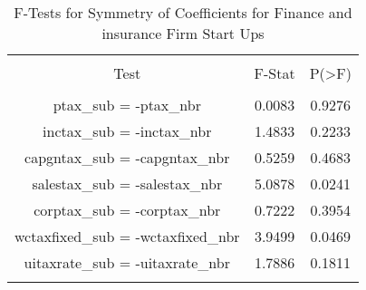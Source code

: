 
\begin{table}[!htbp] \centering 
  \caption{F-Tests for Symmetry of Coefficients for Finance and insurance Firm Start Ups} 
  \label{52Ftests} 
\begin{tabular}{@{\extracolsep{5pt}} ccc} 
\\[-1.8ex]\hline 
\hline \\[-1.8ex] 
Test & F-Stat & P(\textgreater F) \\ 
\hline \\[-1.8ex] 
ptax\_sub = -ptax\_nbr & 0.0083 & 0.9276 \\ 
inctax\_sub = -inctax\_nbr & 1.4833 & 0.2233 \\ 
capgntax\_sub = -capgntax\_nbr & 0.5259 & 0.4683 \\ 
salestax\_sub = -salestax\_nbr & 5.0878 & 0.0241 \\ 
corptax\_sub = -corptax\_nbr & 0.7222 & 0.3954 \\ 
wctaxfixed\_sub = -wctaxfixed\_nbr & 3.9499 & 0.0469 \\ 
uitaxrate\_sub = -uitaxrate\_nbr & 1.7886 & 0.1811 \\ 
\hline \\[-1.8ex] 
\end{tabular} 
\end{table} 
